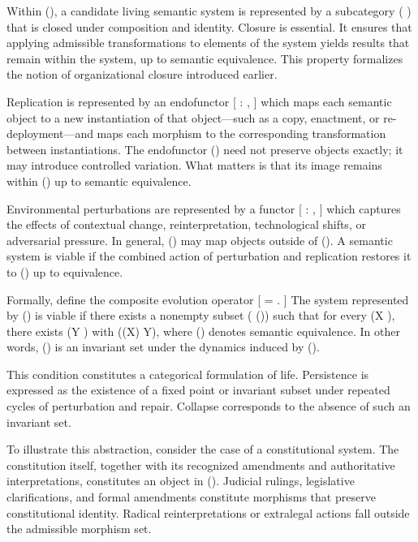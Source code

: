 \documentclass[11pt,oneside]{article}
\begin{document}
Within (), a candidate living semantic system is represented by a subcategory ( \subset {}) that is closed under composition and identity. Closure is essential. It ensures that applying admissible transformations to elements of the system yields results that remain within the system, up to semantic equivalence. This property formalizes the notion of organizational closure introduced earlier.

Replication is represented by an endofunctor
[
 :  \to {},
]
which maps each semantic object to a new instantiation of that object—such as a copy, enactment, or re-deployment—and maps each morphism to the corresponding transformation between instantiations. The endofunctor () need not preserve objects exactly; it may introduce controlled variation. What matters is that its image remains within () up to semantic equivalence.

Environmental perturbations are represented by a functor
[
 :  \to {},
]
which captures the effects of contextual change, reinterpretation, technological shifts, or adversarial pressure. In general, () may map objects outside of (). A semantic system is viable if the combined action of perturbation and replication restores it to () up to equivalence.

Formally, define the composite evolution operator
[
 =  \circ {}.
]
The system represented by () is viable if there exists a nonempty subset ( \subset {}()) such that for every (X \in {}), there exists (Y \in {}) with ((X) \simeq Y), where (\simeq) denotes semantic equivalence. In other words, () is an invariant set under the dynamics induced by ().

This condition constitutes a categorical formulation of life. Persistence is expressed as the existence of a fixed point or invariant subset under repeated cycles of perturbation and repair. Collapse corresponds to the absence of such an invariant set.

To illustrate this abstraction, consider the case of a constitutional system. The constitution itself, together with its recognized amendments and authoritative interpretations, constitutes an object in (). Judicial rulings, legislative clarifications, and formal amendments constitute morphisms that preserve constitutional identity. Radical reinterpretations or extralegal actions fall outside the admissible morphism set.
\end{document}
